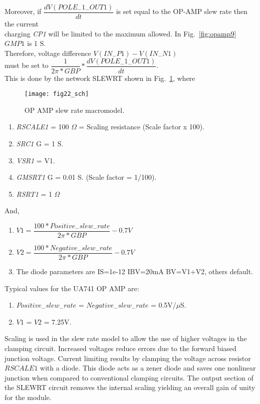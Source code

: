 Moreover, if $\dfrac{ dV(POLE_{-}1_{-}OUT1)}{dt}$ is set equal to the OP-AMP slew rate then the current\\
 
charging \textit{CP1} will be limited to the maximum allowed. In Fig.~\ref{fig:opamp9} $GMP1$ is 1 S. \\

Therefore, voltage difference  $ V(IN_{-}P1) - V(IN_{-}N1)$\\

must be set to $\dfrac{1}{2\pi*GBP}*\dfrac{ dV(POLE_{-}1_{-}OUT1) } {dt}$.\\

This is done by the network SLEWRT shown in Fig.~\ref{fig:opamp22}, where

\begin{figure}
  \centering
  \texttt{[image: fig22\_sch]}
  \caption{OP AMP slew rate macromodel.}
  \label{fig:opamp22}
\end{figure}

\begin{enumerate}
\item \textit{RSCALE1}  = 100 $\Omega$ = Scaling resistance (Scale factor x 100).
\item \textit{SRC1}   G = 1 S.
\item \textit{VSR1}    = V1.
\item \textit{GMSRT1}  G = 0.01 S. (Scale factor = 1/100).
\item \textit{RSRT1}    = 1 $\Omega$
\end{enumerate}
And, 
\begin{enumerate}
\item $V1 = \dfrac{100 * Positive_{-}slew_{-}rate}{2\pi*GBP}-0.7V$
\item $V2 = \dfrac{100 * Negative_{-}slew_{-}rate}{2\pi*GBP}-0.7V$
\item The diode parameters are IS=1e-12 IBV=20mA BV=V1+V2, others default.
\end{enumerate}

Typical values for the UA741 OP AMP are:
\begin{enumerate}
\item $Positive_{-}slew_{-}rate$ = $Negative_{-}slew_{-}rate$ = 0.5V/$\mu$S.
\item $V1$ = $V2$ = 7.25V.
\end{enumerate}

Scaling is used in the slew rate model to allow the use of higher voltages in the clamping circuit. Increased voltages reduce errors due to the forward biased junction voltage. Current limiting results by clamping the voltage across resistor $RSCALE1$ with a diode. This diode acts as a zener diode and saves one nonlinear junction when compared to conventional clamping circuits.  The output section of the SLEWRT circuit removes the internal scaling yielding an overall gain of unity for the module.\\


